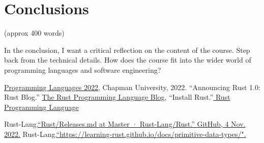 \documentclass{article}
\theoremstyle{theorem}
\theoremstyle{definition}
\theoremstyle{remark}
\begin{document}
\section{Conclusions}\label{conclusions}

(approx 400 words)

In the conclusion, I want a critical reflection on the content of the course. Step back from the technical details. How does the course fit into the wider world of programming languages and software engineering?


\begin{thebibliography}{99}
 \href{https://github.com/alexhkurz/programming-languages-2022/blob/main/README.md}{Programming Languages 2022}, Chapman University, 2022.
“Announcing Rust 1.0: Rust Blog.” \href{https://blog.rust-lang.org/2015/05/15/Rust-1.0.html}{The Rust Programming Language Blog},
 “Install Rust.”\href{https://github.com/alexhkurz/programming-languages-2022/blob/main/README.md}{ Rust Programming Language }

Rust-Lang.\href{https://github.com/rust-lang/rust/blob/master/RELEASES.md}  {“Rust/Releases.md at Master · Rust-Lang/Rust.” GitHub, 4 Nov. 2022.} 
Rust-Lang.\href{https://learning-rust.github.io/docs/primitive-data-types/}  {“https://learning-rust.github.io/docs/primitive-data-types/".} 
\end{thebibliography}
\end{document}
